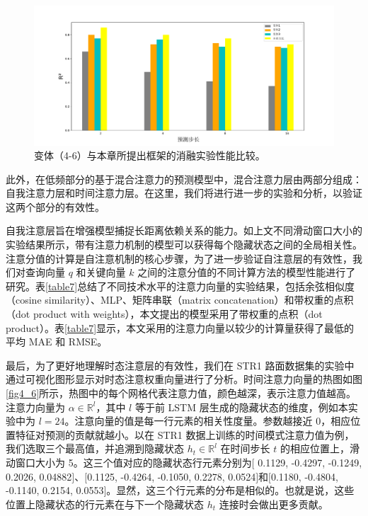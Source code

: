 \begin{figure}[ht]
\begin{center}
\includegraphics[scale=0.26]{./ch4/fig4_4.pdf}
\caption{变体（4-6）与本章所提出框架的消融实验性能比较。} \label{fig4_5}
\end{center}
\end{figure}

此外，在低频部分的基于混合注意力的预测模型中，混合注意力层由两部分组成：自我注意力层和时间注意力层。在这里，我们将进行进一步的实验和分析，以验证这两个部分的有效性。

自我注意层旨在增强模型捕捉长距离依赖关系的能力。如上文不同滑动窗口大小的实验结果所示，带有注意力机制的模型可以获得每个隐藏状态之间的全局相关性。注意分值的计算是自注意机制的核心步骤，为了进一步验证自注意层的有效性，我们对查询向量 $q$ 和关键向量 $k$ 之间的注意分值的不同计算方法的模型性能进行了研究。表\ref{table7}总结了不同技术水平的注意力向量的实验结果，包括余弦相似度（cosine similarity）\cite{AGraves2014}、MLP\cite{DBahdanau2014}、矩阵串联（matrix concatenation）和带权重的点积（dot product with weights），本文提出的模型采用了带权重的点积（dot product）。表\ref{table7}显示，本文采用的注意力向量以较少的计算量获得了最低的平均 MAE 和 RMSE。

最后，为了更好地理解时态注意层的有效性，我们在 STR1 路面数据集的实验中通过可视化图形显示对时态注意权重向量进行了分析。时间注意力向量的热图如图\ref{fig4_6}所示，热图中的每个网格代表注意力值，颜色越深，表示注意力值越高。注意力向量为 $\alpha \in \mathbb{R}^{l}$，其中 $l$ 等于前 LSTM 层生成的隐藏状态的维度，例如本实验中为 $l=24$。注意向量的值是每一行元素的相关性度量。参数越接近 0，相应位置特征对预测的贡献就越小。以在 STR1 数据上训练的时间模式注意力值为例，我们选取三个最高值，并追溯到隐藏状态 $h_{t} \in \mathbb{R}^{l}$ 在时间步长 $t$ 的相应位置上，滑动窗口大小为 5。这三个值对应的隐藏状态行元素分别为$[$ 0.1129, -0.4297, -0.1249, 0.2026, 0.04882$]$、$[$0.1125, -0.4264, -0.1050, 0.2278, 0.0524$]$和$[$0.1180, -0.4804, -0.1140, 0.2154, 0.0553$]$。显然，这三个行元素的分布是相似的。也就是说，这些位置上隐藏状态的行元素在与下一个隐藏状态 $h_{t}$ 连接时会做出更多贡献。

